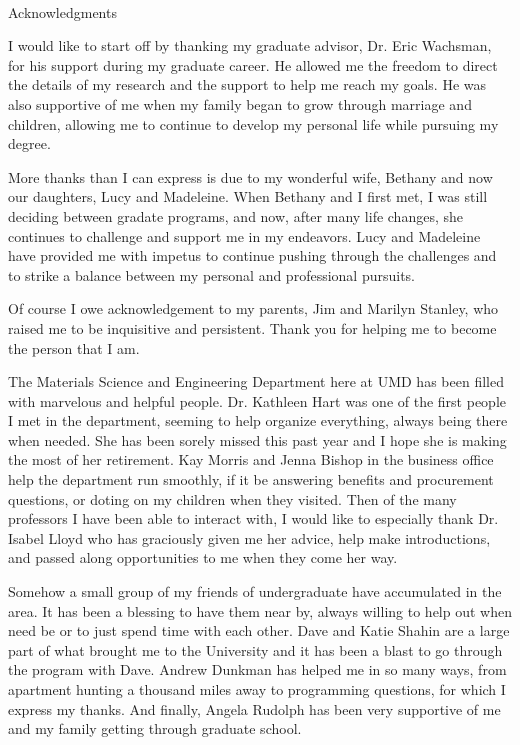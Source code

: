 

\renewcommand{\baselinestretch}{2}
\small\normalsize
\hbox{\ }

\vspace{-.65in}

\begin{center}
\large{Acknowledgments}
\end{center}

\vspace{1ex}

I would like to start off by thanking my graduate advisor, Dr. Eric Wachsman, for his support during my graduate career.
He allowed me the freedom to direct the details of my research and the support to help me reach my goals.
He was also supportive of  me when my family began to grow through marriage and children, allowing me to continue to develop my personal life while pursuing my degree.

More thanks than I can express is due to my wonderful wife, Bethany and now our daughters, Lucy and Madeleine.
When Bethany and I first met, I was still deciding between gradate programs, and now, after many life changes, she continues to challenge and support me in my endeavors.
Lucy and Madeleine have provided me with impetus to continue pushing through the challenges and to strike a balance between my personal and professional pursuits.

Of course I owe acknowledgement to my parents, Jim and Marilyn Stanley, who raised me to be inquisitive and persistent.
Thank you for helping me to become the person that I am.

The Materials Science and Engineering Department here at UMD has been filled with marvelous and helpful people.
Dr. Kathleen Hart was one of the first people I met in the department, seeming to help organize everything, always being there when needed.
She has been sorely missed this past year and I hope she is making the most of her retirement.
Kay Morris and Jenna Bishop in the business office help the department run smoothly, if it be answering benefits and procurement questions, or doting on my children when they visited.
Then of the many professors I have been able to interact with, I would like to especially thank Dr. Isabel Lloyd who has graciously given me her advice, help make introductions, and passed along opportunities to me when they come her way.

Somehow a small group of my friends of undergraduate have accumulated in the area.
It has been a blessing to have them near by, always willing to help out when need be or to just spend time with each other.
Dave and Katie Shahin are a large part of what brought me to the University and it has been a blast to go through the program with Dave.
Andrew Dunkman has helped me in so many ways, from apartment hunting a thousand miles away to programming questions, for which I express my thanks.
And finally, Angela Rudolph has been very supportive of me and my family getting through graduate school.

